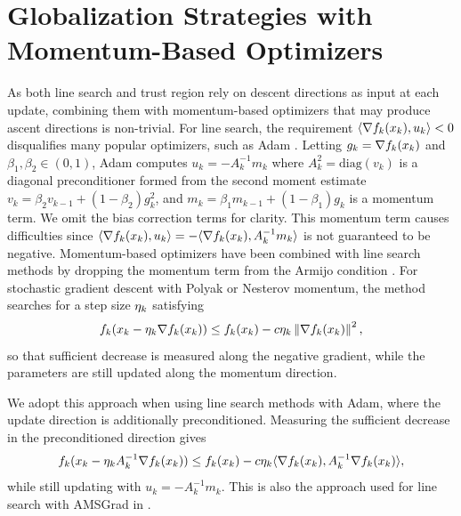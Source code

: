 \FloatBarrier
\section{Globalization Strategies with Momentum-Based Optimizers} \label{sec:momentum}
As both line search and trust region rely on descent directions as input at each update, combining them with momentum-based optimizers that may produce ascent directions is non-trivial. For line search, the requirement $\langle \nabla f_k(x_{k}), u_{k} \rangle < 0$ disqualifies many popular optimizers, such as Adam \cite{kingma2015adam}. Letting $g_k = \nabla f_k(x_{k})$ and $\beta_1, \beta_2 \in (0, 1)$, Adam computes $u_k = -A^{-1}_k m_k$ where $A_k^2 = \mathrm{diag}(v_k)$ is a diagonal preconditioner formed from the second moment estimate $v_k = \beta_2 v_{k-1} + (1 - \beta_2) g_k^2$, and $m_k = \beta_1 m_{k-1} + (1 - \beta_1) g_k$ is a momentum term. We omit the bias correction terms for clarity. This momentum term causes difficulties since $\langle \nabla f_k(x_{k}), u_{k} \rangle = -\langle \nabla f_k(x_{k}), A_k^{-1} m_k \rangle$ is not guaranteed to be negative. Momentum-based optimizers have been combined with line search methods by dropping the momentum term from the Armijo condition \cite{vaswani2020adaptive}. For stochastic gradient descent with Polyak or Nesterov momentum, the method searches for a step size $\eta_{k}$ satisfying
\begin{equation}
    f_k(x_{k} - \eta_{k} \nabla f_k(x_{k})) \le f_k(x_{k}) - c \eta_{k} \left \lVert \nabla f_k(x_{k}) \right \rVert^2,
    \label{eq:momentum_armijo_condition}
\end{equation}
so that sufficient decrease is measured along the negative gradient, while the parameters are still updated along the momentum direction.

We adopt this approach when using line search methods with Adam, where the update direction is additionally preconditioned. Measuring the sufficient decrease in the preconditioned direction gives
\begin{equation}
    f_k(x_{k} - \eta_{k} A_k^{-1} \nabla f_k(x_{k})) \le f_k(x_{k}) - c \eta_{k} \langle \nabla f_k(x_{k}), A_k^{-1} \nabla f_k(x_{k}) \rangle,
    \label{eq:adam_armijo_condition}
\end{equation}
while still updating with $u_k = -A_k^{-1} m_k$. This is also the approach used for line search with AMSGrad in .

